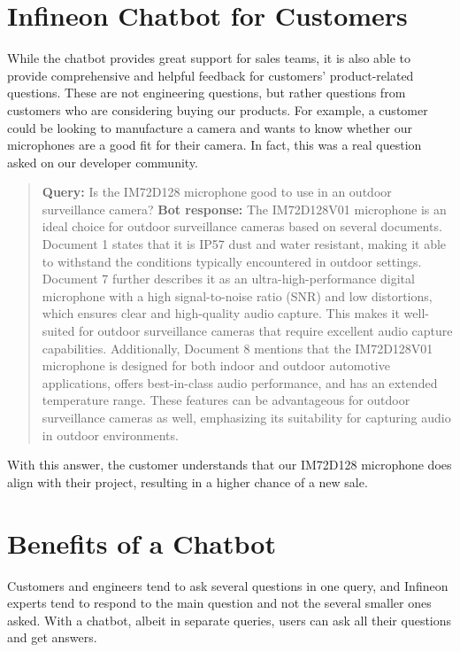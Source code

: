 \documentclass{article}
\begin{document}
\section*{Infineon Chatbot for Customers}
While the chatbot provides great support for sales teams, it is also able to provide comprehensive and helpful feedback for customers' product-related questions. These are not engineering questions, but rather questions from customers who are considering buying our products. For example, a customer could be looking to manufacture a camera and wants to know whether our microphones are a good fit for their camera. In fact, this was a real question asked on our developer community. \cite{DEV}
\begin{quote}
\textbf{Query:} Is the IM72D128 microphone good to use in an outdoor surveillance camera?
\newline
\textbf{Bot response:} The IM72D128V01 microphone is an ideal choice for outdoor surveillance cameras based on several documents. Document 1 states that it is IP57 dust and water resistant, making it able to withstand the conditions typically encountered in outdoor settings. Document 7 further describes it as an ultra-high-performance digital microphone with a high signal-to-noise ratio (SNR) and low distortions, which ensures clear and high-quality audio capture. This makes it well-suited for outdoor surveillance cameras that require excellent audio capture capabilities. Additionally, Document 8 mentions that the IM72D128V01 microphone is designed for both indoor and outdoor automotive applications, offers best-in-class audio performance, and has an extended temperature range. These features can be advantageous for outdoor surveillance cameras as well, emphasizing its suitability for capturing audio in outdoor environments.
\end{quote}
With this answer, the customer understands that our IM72D128 microphone does align with their project, resulting in a higher chance of a new sale.

\section*{Benefits of a Chatbot}
Customers and engineers tend to ask several questions in one query, and Infineon experts tend to respond to the main question and not the several smaller ones asked. With a chatbot, albeit in separate queries, users can ask all their questions and get answers.
\end{document}
